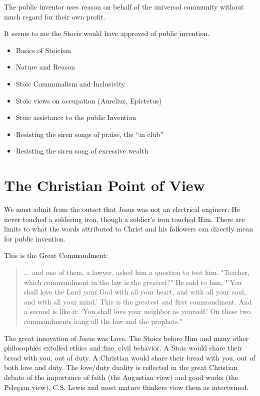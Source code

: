 \documentclass[
	fontsize=10pt, %
	twoside=false, %
	secnumdepth=1, %
]{kaobook}
\begin{document}
The public inventor uses reason on behalf of the
universal community without much regard for their own
profit.

It seems to me the Stocis would have approved of public invention.

\begin{itemize}
\item Basics of Stoicism
\item Nature and Reason
\item Stoic Communalism and Inclusivity
\item Stoic views on occupation (Aurelius, Epictetus)
\item Stoic assistance to the public Invention
\item Resisting the siren songs of praise, the ``in club''
  \item Resisting the siren song of excessive wealth
\end{itemize}


\chapter{The Christian Point of View}


We must admit from the outset that Jesus was not
an electrical engineer.
He never touched a soldering iron, though a soldier's iron touched Him.
There are limits to what the words attributed to Christ and his followers
can directly mean for public invention.

This is the Great Commandment:
\blockquote{
... and one of them, a lawyer, asked him a question to test
him. "Teacher, which commandment in the law is the greatest?" He said
to him, "'You shall love the Lord your God with all your heart, and
with all your soul, and with all your mind.' This is the greatest and
first commandment. And a second is like it: 'You shall love your
neighbor as yourself.' On these two commandments hang all the law and
the prophets."
}

The great innovation of Jesus was Love.
The Stoics before Him and many other philosophies extolled ethics
and fine, civil behavior.
A Stoic would share their bread with you, out of duty.
A Christian would share their bread with you, out of both love and duty.
The love/duty duality is reflected in the great Christian debate
of the importance of faith (the Augustian view) and good works (the Pelegian view).
C.S. Lewis and most mature thinkers view them as intertwined.
\end{document}
